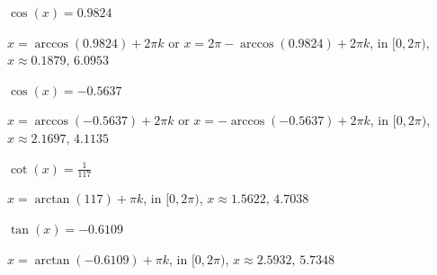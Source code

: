 \documentclass{ximera}
\begin{document}
\begin{question}
\begin{problem}
$\cos(x) = 0.9824$

\begin{solution}
$x = \arccos(0.9824) + 2\pi k$ or $x = 2\pi - \arccos(0.9824) + 2\pi k$, in  $[0, 2\pi)$, $x \approx 0.1879, \, 6.0953$
\end{solution}
\end{problem}

\begin{problem}
$\cos(x) = -0.5637$

\begin{solution}
$x = \arccos(-0.5637) + 2\pi k$ or $x = - \arccos(-0.5637)  + 2\pi k$, in  $[0, 2\pi)$, $x \approx 2.1697, \, 4.1135$
\end{solution}
\end{problem}

\begin{problem}
$\cot(x) = \frac{1}{117}$

\begin{solution}
$x = \arctan(117) + \pi k$, in  $[0, 2\pi)$, $x \approx 1.5622, \, 4.7038$
\end{solution}
\end{problem}

\begin{problem} \label{equarctriglast}
$\tan(x) = -0.6109$

\begin{solution}
$x =  \arctan(-0.6109) + \pi k$, in  $[0, 2\pi)$, $x \approx 2.5932, \, 5.7348$
\end{solution}
\end{problem}

\end{question}
\end{document}
